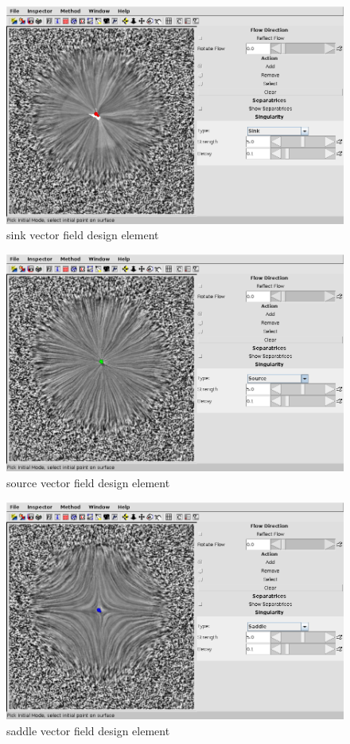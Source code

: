 \documentclass[a4paper,10pt,notitlepage]{scrartcl}
\begin{document}
\begin{figure}
  \centering
  \includegraphics[scale=0.5]{img-3-2/sink.png}
  \caption{sink vector field design element}
  \label{fig:sink}
\end{figure}

\begin{figure}
  \centering
  \includegraphics[scale=0.5]{img-3-2/source.png}
  \caption{source vector field design element}
  \label{fig:source}
\end{figure}

\begin{figure}
  \centering
  \includegraphics[scale=0.5]{img-3-2/saddle.png}
  \caption{saddle vector field design element}
  \label{fig:saddle}
\end{figure}
\end{document}
